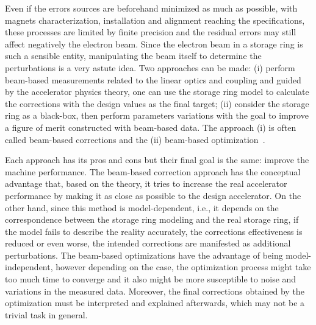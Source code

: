 Even if the errors sources are beforehand minimized as much as possible, with magnets characterization, installation and alignment reaching the specifications, these processes are limited by finite precision and the residual errors may still affect negatively the electron beam. Since the electron beam in a storage ring is such a sensible entity, manipulating the beam itself to determine the perturbations is a very astute idea. Two approaches can be made: (i) perform beam-based measurements related to the linear optics and coupling and guided by the accelerator physics theory, one can use the storage ring model to calculate the corrections with the design values as the final target; (ii) consider the storage ring as a black-box, then perform parameters variations with the goal to improve a figure of merit constructed with beam-based data. The approach (i) is often called beam-based corrections and the (ii) beam-based optimization~\cite{huang2019beam}.


Each approach has its pros and cons but their final goal is the same: improve the machine performance. The beam-based correction approach has the conceptual advantage that, based on the theory, it tries to increase the real accelerator performance by making it as close as possible to the design accelerator. On the other hand, since this method is model-dependent, i.e., it depends on the correspondence between the storage ring modeling and the real storage ring, if the model fails to describe the reality accurately, the corrections effectiveness is reduced or even worse, the intended corrections are manifested as additional perturbations. The beam-based optimizations have the advantage of being model-independent, however depending on the case, the optimization process might take too much time to converge and it also might be more susceptible to noise and variations in the measured data. Moreover, the final corrections obtained by the optimization must be interpreted and explained afterwards, which may not be a trivial task in general.

